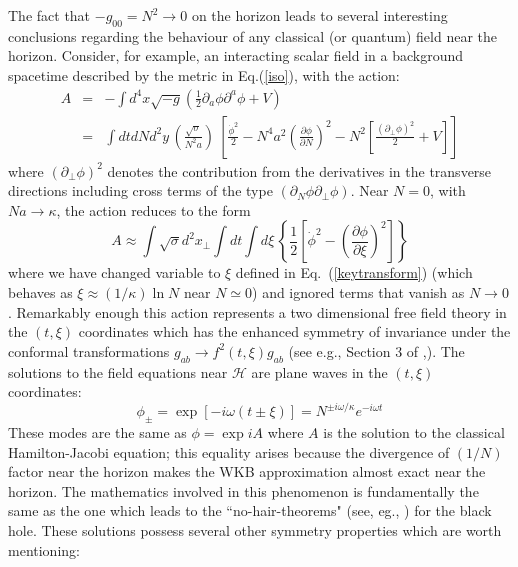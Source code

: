 \documentclass[12pt]{iopart}
\begin{document}
  The fact that $-g_{00} =N^2 \to 0$ on the horizon leads to several interesting conclusions regarding
  the behaviour of  any classical (or quantum)
  field  near the horizon. Consider, for example, an interacting scalar field in a background spacetime described by the metric in Eq.(\ref{iso}),
  with the action: 
  \begin{eqnarray}
  A &=& -\int d^4x \sqrt{-g} \left( \frac{1}{2} \partial_a \phi \partial^a \phi +V \right)\\
 &=& \int dt dN d^2y\, \left(\frac{\sqrt{\sigma}}{N^2a}\right)
 \  \left[ \frac {\dot \phi^2}{2} -N^4a^2
 \left(  \frac{\partial \phi}{\partial N}\right)^2- N^2\left[\frac
  {(\partial_\perp \phi)^2}{2} + V\right] \right]\nonumber
  \end{eqnarray}
where $(\partial_\perp \phi)^2$ denotes the contribution from the derivatives in the transverse directions
including cross terms of the type $(\partial_N \phi \partial_\perp  \phi)$.
  Near $N=0$, with $Na\to \kappa$, the action reduces to the form 
  \begin{equation}
  A\approx   \int \sqrt{\sigma} d^2x_\perp \int dt \int d\xi \,  \left\{ \frac{1}{2} \left[ \dot \phi^2 - 
  \left(  \frac{\partial \phi}{\partial \xi}\right)^2 \right]  \right\}
  \end{equation}
  where we have changed variable to $\xi$ defined in Eq.~(\ref{keytransform}) (which behaves as
$\xi\approx (1/\kappa)\ln N$ near $N\simeq 0$) and ignored terms that vanish as 
  $N\to 0$. Remarkably enough this action represents a two dimensional free field theory
  in the $(t,\xi)$ coordinates  which has the enhanced symmetry of invariance under
  the conformal transformations $g_{ab} \to f^2(t,\xi) g_{ab}$ (see e.g., Section 3 of \cite{Padmanabhan:2002ha},\cite{solo}). 
The solutions to the
  field equations near $\mathcal{H}$  are plane waves in the $(t,\xi)$ coordinates:
   \begin{equation}
   \phi_\pm = \exp[-i\omega (t \pm  \xi)] 
   = N^{\pm i\omega/\kappa}e^{-i\omega t}
   \label{twotwo}
   \end{equation}
   These modes are the same as $\phi=\exp iA$ where $A$ is the solution 
    to the classical  Hamilton-Jacobi equation; this equality arises because the divergence of $(1/N)$ factor near the horizon 
   makes the WKB approximation almost exact near the horizon. The mathematics involved in this phenomenon
   is fundamentally the same as the one which leads to the ``no-hair-theorems" 
  (see, eg.,  \cite{Bekenstein:1998aw}) for the black hole.
These solutions possess several other symmetry properties  which are worth mentioning:
\end{document}
